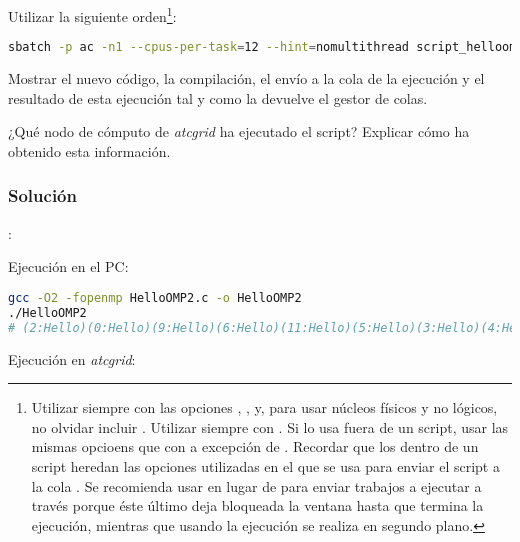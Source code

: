 Utilizar la siguiente orden\footnote{%
	Utilizar siempre con  las opciones , ,  y, para usar núcleos físicos y no lógicos, no olvidar incluir .
	Utilizar siempre con .
	Si lo usa fuera de un script, usar las mismas opcioens que con  a excepción de .
	Recordar que los  dentro de un script heredan las opciones utilizadas en el  que se usa para enviar el script a la cola .
	Se recomienda usar  en lugar de  para enviar trabajos a ejecutar a través  porque éste último deja bloqueada la ventana hasta que termina la ejecución, mientras que usando  la ejecución se realiza en segundo plano.
}:

\begin{lstlisting}[language=sh]
sbatch -p ac -n1 --cpus-per-task=12 --hint=nomultithread script_helloomp.sh
\end{lstlisting}

Mostrar el nuevo código, la compilación, el envío a la cola de la ejecución y el resultado de esta ejecución tal y como la devuelve el gestor de colas.

¿Qué nodo de cómputo de \textit{atcgrid} ha ejecutado el script?
Explicar cómo ha obtenido esta información.

\subsubsection{Solución}

:


Ejecución en el PC\@:
\begin{lstlisting}[language=sh]
gcc -O2 -fopenmp HelloOMP2.c -o HelloOMP2
./HelloOMP2
# (2:Hello)(0:Hello)(9:Hello)(6:Hello)(11:Hello)(5:Hello)(3:Hello)(4:Hello)(10:Hello)(1:Hello)(7:Hello)(8:Hello)(0:World)
\end{lstlisting}

Ejecución en \textit{atcgrid}:

